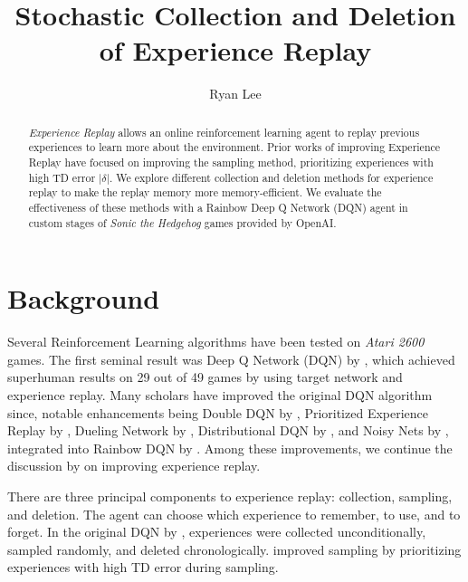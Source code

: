 \documentclass{article} %
\title{Stochastic Collection and Deletion of Experience Replay}
\author{Ryan Lee}
\begin{document}
\maketitle

\begin{abstract}
\textit{Experience Replay} allows an online reinforcement learning agent to replay previous experiences to learn more about the environment. Prior works of improving Experience Replay have focused on improving the sampling method, prioritizing experiences with high TD error $\lvert \delta \rvert$. We explore different collection and deletion methods for experience replay to make the replay memory more memory-efficient. We evaluate the effectiveness of these methods with a Rainbow Deep Q Network (DQN) agent in custom stages of \textit{Sonic the Hedgehog} games provided by OpenAI.
\end{abstract}





\section{Background}
Several Reinforcement Learning algorithms have been tested on \textit{Atari 2600} games. The first seminal result was Deep Q Network (DQN) by \cite{DQN}, which achieved superhuman results on 29 out of 49 games by using target network and experience replay. Many scholars have improved the original DQN algorithm since, notable enhancements being Double DQN by \cite{Double}, Prioritized Experience Replay by \cite{PER}, Dueling Network by \cite{DuelingDQN}, Distributional DQN by \cite{DistributionalDQN}, and Noisy Nets by \cite{NoisyNetDQN}, integrated into Rainbow DQN by \cite{Rainbow}. Among these improvements, we continue the discussion by \cite{PER} on improving experience replay.

There are three principal components to experience replay: collection, sampling, and deletion. The agent can choose which experience to remember, to use, and to forget. In the original DQN by \cite{DQN}, experiences were collected unconditionally, sampled randomly, and deleted chronologically. \cite{PER} improved sampling by prioritizing experiences with high TD error during sampling.
\end{document}
